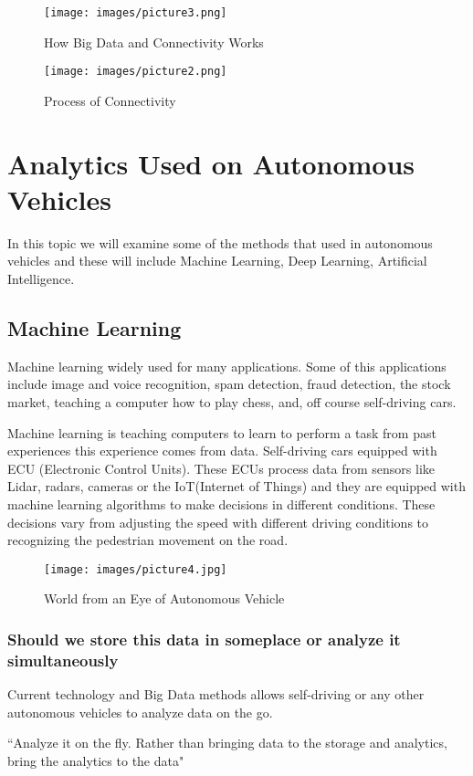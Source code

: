 \documentclass{acmart}
\begin{document}
\begin{figure}[!ht]
  \centering
      \texttt{[image: images/picture3.png]}
  \caption{How Big Data and Connectivity Works}\label{F:connectivity}
\end{figure}

\begin{figure}[!ht]
  \centering
      \texttt{[image: images/picture2.png]}
  \caption{Process of Connectivity}\label{fig:hbsconnectivitysteps}
\end{figure}


\section{Analytics Used on Autonomous Vehicles}
In this topic we will examine some of the methods that used in autonomous vehicles and these will include Machine Learning, Deep Learning, Artificial Intelligence.


\subsection{Machine Learning}

Machine learning widely used for many applications. Some of this applications include image and voice recognition, spam detection, fraud detection, the stock market, teaching a computer how to play chess, and, off course self-driving cars. 
\par Machine learning is teaching computers to learn to perform a task from past experiences this experience comes from data. Self-driving cars equipped with ECU (Electronic Control Units). These ECUs process data from sensors like Lidar, radars, cameras or the IoT(Internet of Things) and they are equipped with machine learning algorithms to make decisions in different conditions.\cite{www-kdnuggets} These decisions vary from adjusting the speed with different driving conditions to recognizing the pedestrian movement on the road. 

\begin{figure}[h]
  \centering
      \texttt{[image: images/picture4.jpg]}
  \caption{World from an Eye of Autonomous Vehicle}\label{F:Lidar}
\end{figure}

\subsubsection{Should we store this data in someplace or analyze it simultaneously}
Current technology and Big Data methods allows self-driving or any other autonomous vehicles to analyze data on the go.\cite{www-sas} 
\begin{center}
    ``Analyze it on the fly. Rather than bringing data to the storage and analytics, bring the analytics to the data"\cite{www-sas}
\end{center}
\end{document}
